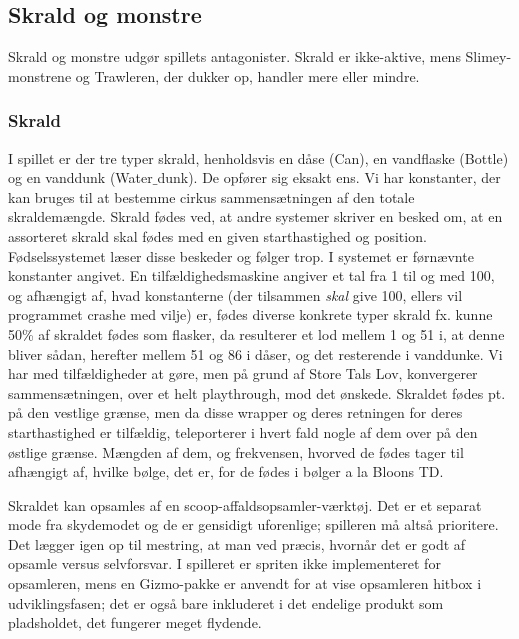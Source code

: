 \subsection{Skrald og monstre}\label{sec:skrald_monstre}
Skrald og monstre udgør spillets antagonister. Skrald er ikke-aktive, mens Slimey-monstrene og Trawleren, der dukker op, handler mere eller mindre.
\subsubsection{Skrald}
I spillet er der tre typer skrald, henholdsvis en dåse (Can), en vandflaske (Bottle) og en vanddunk (Water$\_$dunk). De opfører sig eksakt ens. Vi har konstanter, der kan bruges til at bestemme cirkus sammensætningen af den totale skraldemængde. Skrald fødes ved, at andre systemer skriver en besked om, at en assorteret skrald skal fødes med en given starthastighed og position. Fødselssystemet læser disse beskeder og følger trop. I systemet er førnævnte konstanter angivet. En tilfældighedsmaskine angiver et tal fra 1 til og med 100, og afhængigt af, hvad konstanterne (der tilsammen \textit{skal} give 100, ellers vil programmet crashe med vilje) er, fødes diverse konkrete typer skrald fx. kunne 50\% af skraldet fødes som flasker, da resulterer et lod mellem 1 og 51 i, at denne bliver sådan, herefter mellem 51 og 86 i dåser, og det resterende i vanddunke. Vi har med tilfældigheder at gøre, men på grund af Store Tals Lov, konvergerer sammensætningen, over et helt playthrough, mod det ønskede. Skraldet fødes pt. på den vestlige grænse, men da disse wrapper og deres retningen for deres starthastighed er tilfældig, teleporterer i hvert fald nogle af dem over på den østlige grænse. Mængden af dem, og frekvensen, hvorved de fødes tager til afhængigt af, hvilke bølge, det er, for de fødes i bølger a la Bloons TD.

Skraldet kan opsamles af en scoop-affaldsopsamler-værktøj. Det er et separat mode fra skydemodet og de er gensidigt uforenlige; spilleren må altså prioritere. Det lægger igen op til mestring, at man ved præcis, hvornår det er godt af opsamle versus selvforsvar. I spilleret er spriten ikke implementeret for opsamleren, mens en Gizmo-pakke er anvendt for at vise opsamleren hitbox i udviklingsfasen; det er også bare inkluderet i det endelige produkt som pladsholdet, det fungerer meget flydende.

